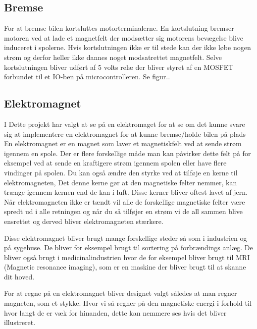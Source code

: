 \subsection{Bremse}

For at bremse bilen kortsluttes motorterminalerne. En kortslutning bremser motoren ved at lade et magnetfelt der modsætter sig motorens bevægelse blive induceret i spolerne. Hvis kortslutningen ikke er til stede kan der ikke løbe nogen strøm og derfor heller ikke dannes noget modsatrettet magnetfelt. Selve kortslutningen bliver udført af 5 volts relæ der bliver styret af en MOSFET forbundet til et IO-ben på microcontrolleren. Se figur.. 

\subsection{Elektromagnet}
I Dette projekt har valgt at se på en elektromaget for at se om det kunne svare sig at implementere en elektromagnet for at kunne bremse/holde bilen på plads
En elektromagnet er en magnet som laver et magnetiskfelt ved at sende strøm igennem en spole. Der er flere forskellige måde man kan påvirker dette felt på for eksempel ved at sende en kraftigere strøm igennem spolen eller have flere vindinger på spolen. Du kan også ændre den styrke ved at tilføje en kerne til elektromagneten, Det denne kerne gør at den magnetiske felter nemmer, kan trænge igennem kernen end de kan i luft. Disse kerner bliver oftest lavet af jern.
Når elektromagneten ikke er tændt vil alle de forskellige magnetiske felter være spredt ud i alle retningen og når du så tilføjer en strøm vi de all sammen blive ensrettet og derved bliver elektromagneten stærkere.

Disse elektromagnet bliver brugt mange forskellige steder så som i industrien og på sygehuse. De bliver for eksempel brugt til sortering på forbrændings anlæg. De bliver også brugt i medicinalindustrien hvor de for eksempel bliver brugt til MRI (Magnetic resonance imaging), som er en maskine der bliver brugt til at skanne dit hoved.
 
For at regne på en elektromagnet bliver designet valgt således at man regner magneten, som et stykke. Hvor vi så regner på den magnetiske energi i forhold til hvor langt de er væk for hinanden, dette kan nemmere ses hvis det bliver illustreret.

